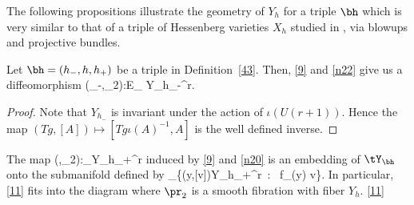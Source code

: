The following propositions illustrate the geometry of  $Y_h$ for a triple $\bh$ which is very similar to that of a triple of Hessenberg varieties $X_h$ studied in \cite[\S3.3]{KL}, via blowups and projective bundles. 

\begin{proposition}\label{40}
	Let $\bh=(h_-,h,h_+)$ be a triple in Definition~\ref{43}. Then, \eqref{9} and \eqref{n22} give us a diffeomorphism
	\beq \label{44} 
		(\pi_-,\pr_2):E_\bh \xrightarrow{~\cong~} Y_{h_-}\times \PP^r.\eeq
\end{proposition}
\begin{proof}
	Note that $Y_{h_-}$ is invariant under the action of $\iota(U(r+1))$. Hence the map $(Tg,[A])\mapsto [Tg\iota (A)^{-1},A]$ is the well defined inverse.
	\end{proof}
\begin{proposition} \label{38}
	The map
		\beq \label{41} (\pi,\pr_2):\tY_\bh \lra  Y_{h_+}\times \PP^r\eeq
		induced by \eqref{9} and \eqref{n20} is an embedding of $\tY_\bh$ onto the submanifold defined by 
		\beq \label{42} \tY_\bh \cong \{(y,[v])\in Y_{h_+}\times \PP^r~:~ f_{\bh}(y) \in \C v\}.\eeq
		In particular, \eqref{11} fits into the diagram   
		\beq \label{37}  
		\eeq
		where $\pr_2$ is a smooth fibration with fiber $Y_h$.
		\eqref{11}
\end{proposition}
